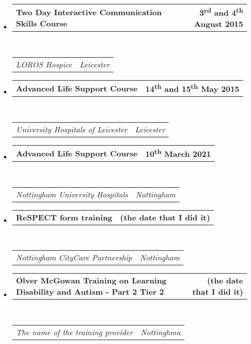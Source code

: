 \documentclass{article}
\makeatletter
\newcommand{\headerrow}[2]
{\begin{tabular*}{\linewidth}{l@{\extracolsep{\fill}}r}
	#1 &
	#2 \\
\end{tabular*}}
\makeatother
\begin{document}
\begin{itemize}
	\item
	\headerrow
		{\textbf{Two Day Interactive Communication Skills Course}}
		{\textbf{3\textsuperscript{rd} and 4\textsuperscript{th} August 2015}}
	\\
	\headerrow
		{\emph{LOROS Hospice}}
		{\emph{Leicester}}

	\item
	\headerrow
		{\textbf{Advanced Life Support Course}}
		{\textbf{14\textsuperscript{th} and 15\textsuperscript{th} May 2015}}
	\\
	\headerrow
		{\emph{University Hospitals of Leicester}}
		{\emph{Leicester}}
	
	\item
	\headerrow
		{\textbf{Advanced Life Support Course}}
		{\textbf{10\textsuperscript{th} March 2021}}
	\\
	\headerrow
		{\emph{Nottingham University Hospitals}}
		{\emph{Nottingham}}
	\item
	\headerrow
		{\textbf{ReSPECT form training}}
		{\textbf{(the date that I did it)}}
	\\
	\headerrow
		{\emph{Nottingham CityCare Partnership}}
		{\emph{Nottingham}}
	\item
	\headerrow
		{\textbf{Olver McGowan Training on Learning Disability and Autism - Part 2 Tier 2}}
		{\textbf{(the date that I did it)}}
	\\
	\headerrow
		{\emph{The name of the training provider}}
		{\emph{Nottinghma}}

\end{itemize}
\end{document}

